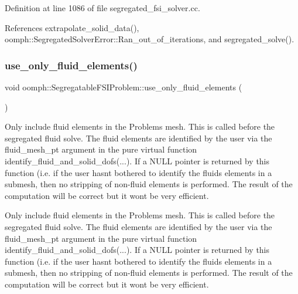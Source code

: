 Definition at line 1086 of file segregated\+\_\+fsi\+\_\+solver.\+cc.



References extrapolate\+\_\+solid\+\_\+data(), oomph\+::\+Segregated\+Solver\+Error\+::\+Ran\+\_\+out\+\_\+of\+\_\+iterations, and segregated\+\_\+solve().

\mbox{\label{classoomph_1_1SegregatableFSIProblem_a13a9841e0aa05bf57ec228b49b311a26}} 
\subsubsection{\texorpdfstring{use\+\_\+only\+\_\+fluid\+\_\+elements()}{use\_only\_fluid\_elements()}}
{\footnotesize\ttfamily void oomph\+::\+Segregatable\+F\+S\+I\+Problem\+::use\+\_\+only\+\_\+fluid\+\_\+elements (\begin{DoxyParamCaption}{ }\end{DoxyParamCaption})\hspace{0.3cm}{\ttfamily [private]}}



Only include fluid elements in the Problem\textquotesingle{}s mesh. This is called before the segregated fluid solve. The fluid elements are identified by the user via the fluid\+\_\+mesh\+\_\+pt argument in the pure virtual function identify\+\_\+fluid\+\_\+and\+\_\+solid\+\_\+dofs(...). If a N\+U\+LL pointer is returned by this function (i.\+e. if the user hasn\textquotesingle{}t bothered to identify the fluids elements in a submesh, then no stripping of non-\/fluid elements is performed. The result of the computation will be correct but it won\textquotesingle{}t be very efficient. 

Only include fluid elements in the Problem\textquotesingle{}s mesh. This is called before the segregated fluid solve. The fluid elements are identified by the user via the fluid\+\_\+mesh\+\_\+pt argument in the pure virtual function identify\+\_\+fluid\+\_\+and\+\_\+solid\+\_\+dofs(...). If a N\+U\+LL pointer is returned by this function (i.\+e. if the user hasn\textquotesingle{}t bothered to identify the fluids elements in a submesh, then no stripping of non-\/fluid elements is performed. The result of the computation will be correct but it won\textquotesingle{}t be very efficient. 

